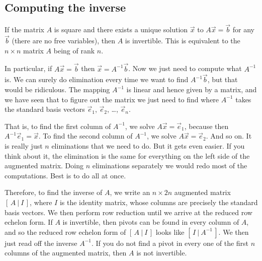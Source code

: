 \subsection{Computing the inverse}

If the matrix $A$ is square and there exists a unique solution
$\vec{x}$ to $A \vec{x} = \vec{b}$ for any $\vec{b}$ (there are no free
variables), then $A$ is invertible.
This is equivalent to the $n \times n$ matrix $A$ being of rank $n$.

In particular, if $A \vec{x} = \vec{b}$ then $\vec{x} = A^{-1} \vec{b}$.
Now we just need to compute what $A^{-1}$ is.  We can surely 
do elimination every time we want to find $A^{-1} \vec{b}$, but that
would be ridiculous.  The mapping $A^{-1}$ is linear and
hence given by a matrix, and we have seen that to figure out the matrix
we just need to find where $A^{-1}$ takes the standard basis vectors
$\vec{e}_1$, 
$\vec{e}_2$, \ldots,
$\vec{e}_n$.

That is, to find the first column of $A^{-1}$, we solve
$A \vec{x} = \vec{e}_1$, because then $A^{-1} \vec{e}_1 = \vec{x}$.
To find the second column of $A^{-1}$, we solve
$A \vec{x} = \vec{e}_2$.  And so on.  It is really just $n$
eliminations that we need to do.  But it gets even easier.
If you think about it, the elimination is the same for
everything on the left side of the augmented matrix.  Doing
$n$ eliminations separately we would redo most of the computations.
Best is to do all at once.

Therefore, to find the inverse of $A$, we write an $n
\times 2n$ augmented matrix $[ \,A ~|~ I\, ]$, where $I$ is the identity
matrix, whose columns are precisely the standard basis vectors.
We then perform row reduction until we arrive at the reduced row echelon
form.  If $A$ is invertible, then pivots can be found in every column of $A$,
and so the 
reduced row echelon form of $[ \,A ~|~ I\, ]$ 
looks like $[ \,I ~|~ A^{-1}\, ]$.
We then just read off the inverse $A^{-1}$.
If you do not find a pivot in every
one of the first $n$ columns of the augmented matrix, then 
$A$ is not invertible.

